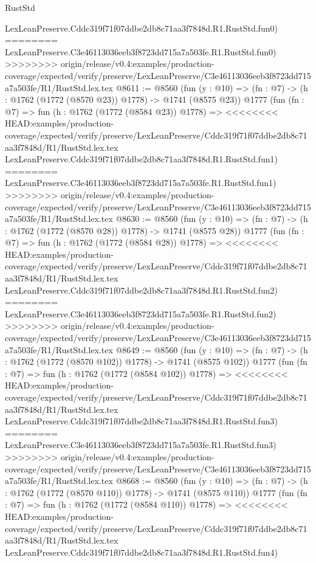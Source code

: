 \begin{lexlean}{RustStd}
\begin{coremodule}
{\begin{coremodule}
{{{{{{{{{{{{{{{    LexLeanPreserve.Cddc319f71f07ddbe2db8c71aa3f7848d.R1.RustStd.fun0)
========
    LexLeanPreserve.C3e46113036eeb3f8723dd715a7a503fe.R1.RustStd.fun0)
>>>>>>>> origin/release/v0.4:examples/production-coverage/expected/verify/preserve/LexLeanPreserve/C3e46113036eeb3f8723dd715a7a503fe/R1/RustStd.lex.tex
@8611 := @8560
    (fun (y : @10) => (fn : @7) -> (h : @1762 (@1772 (@8570 @23)) @1778) -> @1741 (@8575 @23))
    @1777
    (fun (fn : @7) =>
    fun (h : @1762 (@1772 (@8584 @23)) @1778) =>
<<<<<<<< HEAD:examples/production-coverage/expected/verify/preserve/LexLeanPreserve/Cddc319f71f07ddbe2db8c71aa3f7848d/R1/RustStd.lex.tex
    LexLeanPreserve.Cddc319f71f07ddbe2db8c71aa3f7848d.R1.RustStd.fun1)
========
    LexLeanPreserve.C3e46113036eeb3f8723dd715a7a503fe.R1.RustStd.fun1)
>>>>>>>> origin/release/v0.4:examples/production-coverage/expected/verify/preserve/LexLeanPreserve/C3e46113036eeb3f8723dd715a7a503fe/R1/RustStd.lex.tex
@8630 := @8560
    (fun (y : @10) => (fn : @7) -> (h : @1762 (@1772 (@8570 @28)) @1778) -> @1741 (@8575 @28))
    @1777
    (fun (fn : @7) =>
    fun (h : @1762 (@1772 (@8584 @28)) @1778) =>
<<<<<<<< HEAD:examples/production-coverage/expected/verify/preserve/LexLeanPreserve/Cddc319f71f07ddbe2db8c71aa3f7848d/R1/RustStd.lex.tex
    LexLeanPreserve.Cddc319f71f07ddbe2db8c71aa3f7848d.R1.RustStd.fun2)
========
    LexLeanPreserve.C3e46113036eeb3f8723dd715a7a503fe.R1.RustStd.fun2)
>>>>>>>> origin/release/v0.4:examples/production-coverage/expected/verify/preserve/LexLeanPreserve/C3e46113036eeb3f8723dd715a7a503fe/R1/RustStd.lex.tex
@8649 := @8560
    (fun (y : @10) => (fn : @7) -> (h : @1762 (@1772 (@8570 @102)) @1778) -> @1741 (@8575 @102))
    @1777
    (fun (fn : @7) =>
    fun (h : @1762 (@1772 (@8584 @102)) @1778) =>
<<<<<<<< HEAD:examples/production-coverage/expected/verify/preserve/LexLeanPreserve/Cddc319f71f07ddbe2db8c71aa3f7848d/R1/RustStd.lex.tex
    LexLeanPreserve.Cddc319f71f07ddbe2db8c71aa3f7848d.R1.RustStd.fun3)
========
    LexLeanPreserve.C3e46113036eeb3f8723dd715a7a503fe.R1.RustStd.fun3)
>>>>>>>> origin/release/v0.4:examples/production-coverage/expected/verify/preserve/LexLeanPreserve/C3e46113036eeb3f8723dd715a7a503fe/R1/RustStd.lex.tex
@8668 := @8560
    (fun (y : @10) => (fn : @7) -> (h : @1762 (@1772 (@8570 @110)) @1778) -> @1741 (@8575 @110))
    @1777
    (fun (fn : @7) =>
    fun (h : @1762 (@1772 (@8584 @110)) @1778) =>
<<<<<<<< HEAD:examples/production-coverage/expected/verify/preserve/LexLeanPreserve/Cddc319f71f07ddbe2db8c71aa3f7848d/R1/RustStd.lex.tex
    LexLeanPreserve.Cddc319f71f07ddbe2db8c71aa3f7848d.R1.RustStd.fun4)
}}}}}}}}}}}}}}}
\end{coremodule}}
\end{coremodule}
\end{lexlean}
